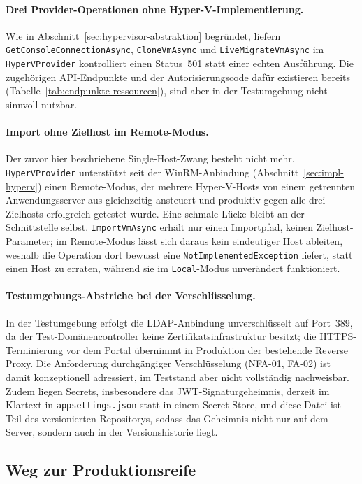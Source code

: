 \documentclass[12pt,a4paper]{article}
\begin{document}
\paragraph{Drei Provider-Operationen ohne Hyper-V-Implementierung.} Wie in Abschnitt~\ref{sec:hypervisor-abstraktion} begründet, liefern \texttt{GetConsoleConnectionAsync}, \texttt{CloneVmAsync} und \texttt{LiveMigrateVmAsync} im \texttt{HyperVProvider} kontrolliert einen Status~501 statt einer echten Ausführung. Die zugehörigen API-Endpunkte und der Autorisierungscode dafür existieren bereits (Tabelle~\ref{tab:endpunkte-ressourcen}), sind aber in der Testumgebung nicht sinnvoll nutzbar.

\paragraph{Import ohne Zielhost im Remote-Modus.} Der zuvor hier beschriebene Single-Host-Zwang besteht nicht mehr. \texttt{HyperVProvider} unterstützt seit der WinRM-Anbindung (Abschnitt~\ref{sec:impl-hyperv}) einen Remote-Modus, der mehrere Hyper-V-Hosts von einem getrennten Anwendungsserver aus gleichzeitig ansteuert und produktiv gegen alle drei Zielhosts erfolgreich getestet wurde. Eine schmale Lücke bleibt an der Schnittstelle selbst. \texttt{ImportVmAsync} erhält nur einen Importpfad, keinen Zielhost-Parameter; im Remote-Modus lässt sich daraus kein eindeutiger Host ableiten, weshalb die Operation dort bewusst eine \texttt{NotImplementedException} liefert, statt einen Host zu erraten, während sie im \texttt{Local}-Modus unverändert funktioniert.

\paragraph{Testumgebungs-Abstriche bei der Verschlüsselung.} In der Testumgebung erfolgt die LDAP-Anbindung unverschlüsselt auf Port~389, da der Test-Domänencontroller keine Zertifikatsinfrastruktur besitzt; die HTTPS-Terminierung vor dem Portal übernimmt in Produktion der bestehende Reverse Proxy. Die Anforderung durchgängiger Verschlüsselung (NFA-01, FA-02) ist damit konzeptionell adressiert, im Teststand aber nicht vollständig nachweisbar. Zudem liegen Secrets, insbesondere das JWT-Signaturgeheimnis, derzeit im Klartext in \texttt{appsettings.json} statt in einem Secret-Store, und diese Datei ist Teil des versionierten Repositorys, sodass das Geheimnis nicht nur auf dem Server, sondern auch in der Versionshistorie liegt.

\subsection{Weg zur Produktionsreife}
\label{sec:weg-produktionsreife}
\end{document}
